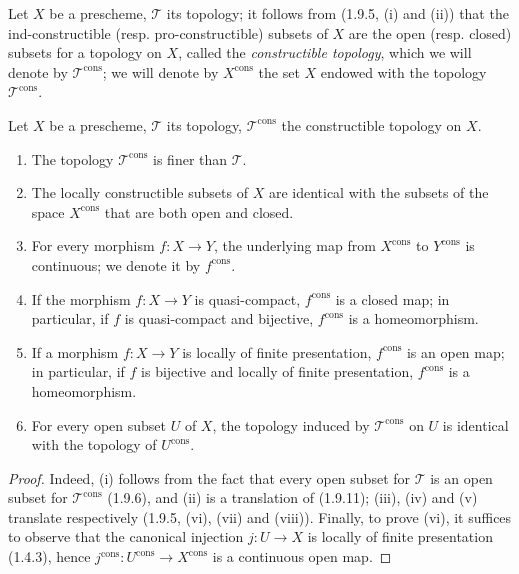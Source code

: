 \begin{env}[1.9.13]
\label{IV.1.9.13}
Let $X$ be a prescheme, $\mathscr T$ its topology; it follows from (1.9.5,
(i) and (ii)) that the ind-constructible (resp. pro-constructible) subsets of
$X$ are the open (resp. closed) subsets for a topology on $X$,
called the \emph{constructible topology}, which we will denote by
$\mathscr T^{\mathrm{cons}}$; we will denote by $X^{\mathrm{cons}}$
the set $X$ endowed with the topology $\mathscr T^{\mathrm{cons}}$.
\end{env}

\begin{proposition}[1.9.14]
\label{IV.1.9.14}
Let $X$ be a prescheme, $\mathscr T$ its topology,
$\mathscr T^{\mathrm{cons}}$ the constructible topology on $X$.
\begin{enumerate}
  \item[\textup{(i)}] The topology $\mathscr T^{\mathrm{cons}}$ is finer than
  $\mathscr T$.
  \item[\textup{(ii)}] The locally constructible subsets of $X$ are identical
  with the subsets of the space $X^{\mathrm{cons}}$ that are both open and
  closed.
  \item[\textup{(iii)}] For every morphism $f:X\to Y$, the underlying map from
  $X^{\mathrm{cons}}$ to $Y^{\mathrm{cons}}$ is continuous; we denote it by
  $f^{\mathrm{cons}}$.
  \item[\textup{(iv)}] If the morphism $f:X\to Y$ is quasi-compact,
  $f^{\mathrm{cons}}$ is a closed map; in particular, if $f$
  is quasi-compact and bijective, $f^{\mathrm{cons}}$ is a homeomorphism.
  \item[\textup{(v)}] If a morphism $f:X\to Y$ is locally of finite
  presentation, $f^{\mathrm{cons}}$ is an open map; in particular,
  if $f$ is bijective and locally of finite presentation,
  $f^{\mathrm{cons}}$ is a homeomorphism.
  \item[\textup{(vi)}] For every open subset $U$ of $X$, the topology induced by
  $\mathscr T^{\mathrm{cons}}$ on $U$ is identical with the topology of
  $U^{\mathrm{cons}}$.
\end{enumerate}
\end{proposition}

\begin{proof}
Indeed, (i) follows from the fact that every open subset for $\mathscr T$ is
an open subset for $\mathscr T^{\mathrm{cons}}$ (1.9.6), and (ii) is a
translation of (1.9.11); (iii), (iv) and (v) translate respectively
(1.9.5, (vi), (vii) and (viii)). Finally, to prove (vi), it suffices to
observe that the canonical injection $j:U\to X$ is locally of finite
presentation (1.4.3), hence
$j^{\mathrm{cons}}:U^{\mathrm{cons}}\to X^{\mathrm{cons}}$ is a
continuous open map.
\end{proof}

